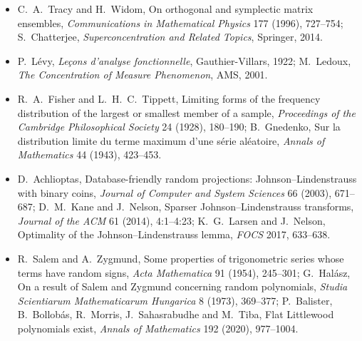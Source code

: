 \begin{itemize}
S.~Janson, T.~Łuczak and A.~Ruciński, An exponential bound for the probability of nonexistence of a specified subgraph in a random graph, in \emph{Random Graphs '87}, Wiley, 1990,
73--87; R.~Boppana and J.~Spencer, A useful elementary correlation inequality, \emph{Journal of Combinatorial Theory, Series A} 50 (1989), 305--307; N.~Alon and J.~Spencer,
\emph{The Probabilistic Method}, 4th ed., Wiley, 2016, Chapter~8.
\item C.~A.~Tracy and H.~Widom, On orthogonal and symplectic matrix ensembles, \emph{Communications in Mathematical Physics} 177 (1996), 727--754; S.~Chatterjee,
\emph{Superconcentration and Related Topics}, Springer, 2014.
\item P.~Lévy, \emph{Leçons d'analyse fonctionnelle}, Gauthier-Villars, 1922; M.~Ledoux, \emph{The Concentration of Measure Phenomenon}, AMS, 2001.
\item R.~A.~Fisher and L.~H.~C.~Tippett, Limiting forms of the frequency distribution of the largest or smallest member of a sample, \emph{Proceedings of the Cambridge Philosophical
Society} 24 (1928), 180--190; B.~Gnedenko, Sur la distribution limite du terme maximum d'une série aléatoire, \emph{Annals of Mathematics} 44 (1943), 423--453.
\item D.~Achlioptas, Database-friendly random projections: Johnson--Lindenstrauss with binary coins, \emph{Journal of Computer and System Sciences} 66 (2003), 671--687; D.~M.~Kane
and J.~Nelson, Sparser Johnson--Lindenstrauss transforms, \emph{Journal of the ACM} 61 (2014), 4:1--4:23; K.~G.~Larsen and J.~Nelson, Optimality of the Johnson--Lindenstrauss lemma,
\emph{FOCS} 2017, 633--638.
\item R.~Salem and A.~Zygmund, Some properties of trigonometric series whose terms have random signs, \emph{Acta Mathematica} 91 (1954), 245--301; G.~Halász, On a result of Salem
and Zygmund concerning random polynomials, \emph{Studia Scientiarum Mathematicarum Hungarica} 8 (1973), 369--377; P.~Balister, B.~Bollobás, R.~Morris, J.~Sahasrabudhe and
M.~Tiba, Flat Littlewood polynomials exist, \emph{Annals of Mathematics} 192 (2020), 977--1004.
\end{itemize}
